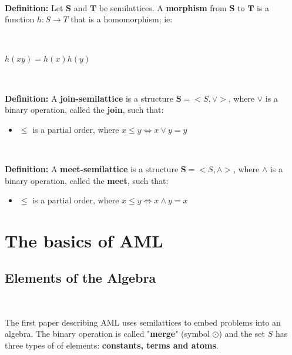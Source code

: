 \documentclass[a4paper, 11pt]{article}
\begin{document}
\

\begin{tcolorbox}
    \textbf{Definition:} Let $\boldsymbol{S}$ and $\boldsymbol{T}$ be semilattices. A \textbf{morphism} from $\boldsymbol{S}$ to $\boldsymbol{T}$ is a function $h: S \rightarrow T$ that is a homomorphism; ie:
    
    \
    
    $h(xy) = h(x)h(y)$
    
\end{tcolorbox}

\

\begin{tcolorbox}
    \textbf{Definition:} A \textbf{join-semilattice} is a structure $\boldsymbol{S} = <S,\lor>$, where $\lor$ is a binary operation, called the \textbf{join}, such that:
    
    \begin{itemize}
        \item $\leq$ is a partial order, where $x \leq y \Leftrightarrow x \lor y = y$
    \end{itemize}

\end{tcolorbox}

\

\begin{tcolorbox}
    \textbf{Definition:} A \textbf{meet-semilattice} is a structure $\boldsymbol{S} = <S,\land>$, where $\land$ is a binary operation, called the \textbf{meet}, such that:
    
    \begin{itemize}
        \item $\leq$ is a partial order, where $x \leq y \Leftrightarrow x \land y = x $
    \end{itemize}

\end{tcolorbox}

\section{The basics of AML}

\subsection{Elements of the Algebra}

\

The first paper describing AML uses semilattices to embed problems into an algebra. The binary operation is called "\textbf{merge}" (symbol $\odot$) and the set $S$ has three types of of elements: \textbf{constants, terms and atoms}.
\end{document}

